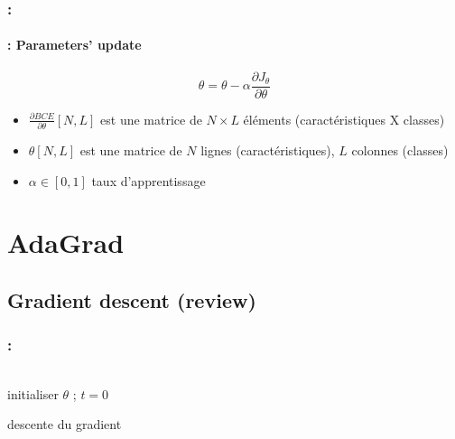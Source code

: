 \documentclass[xcolor=table]{beamer}
\begin{document}
\begin{frame}
	\frametitle{\insertshortsubtitle: \insertsection}
	\framesubtitle{\insertsubsection: Parameters' update}
	
	\[\theta = \theta - \alpha \frac{\partial J_\theta}{\partial \theta}\]
	
	\begin{itemize}
		\item $\frac{\partial BCE}{\partial \theta}[N, L]$ est une matrice de $N\times L$ éléments (caractéristiques X classes)
		\item $\theta[N, L]$ est une matrice de $N$ lignes (caractéristiques), $L$ colonnes (classes)
		\item $\alpha \in [0, 1]$ taux d'apprentissage
	\end{itemize}
	
\end{frame}

\section{AdaGrad}

\begin{frame}
	\frametitle{\insertshortsubtitle}
	\framesubtitle{\insertsection}
	
	
\end{frame}

\subsection{Gradient descent (review)}

\begin{frame}
	\frametitle{\insertshortsubtitle: \insertsection}
	\framesubtitle{\insertsubsection}
	
\begin{columns}
\begin{column}{.7\textwidth}
	\begin{algorithm}[H]
		\KwResult{$ \theta $}
		initialiser $ \theta $ ; $ t = 0 $\;
		\caption{descente du gradient}
	\end{algorithm}
\end{column}
\begin{column}{.3\textwidth}
\end{column}
\end{columns}
	
\end{frame}
\end{document}
